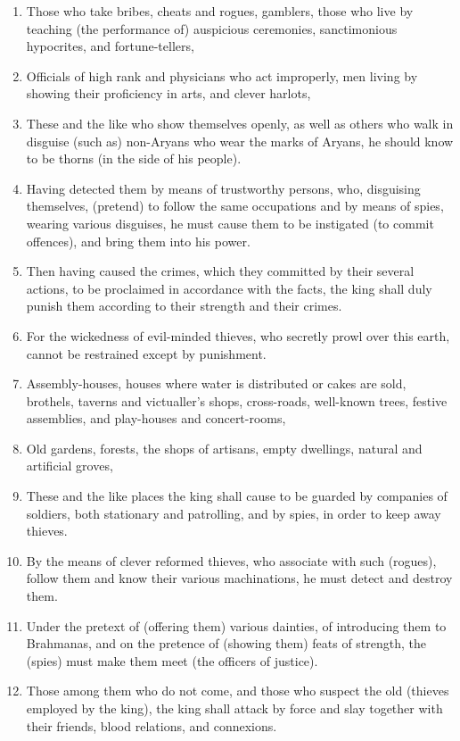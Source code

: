 \begin{enumerate}
\item Those who take bribes, cheats and rogues, gamblers, those who live by teaching (the performance of) auspicious ceremonies, sanctimonious hypocrites, and fortune-tellers,
\item Officials of high rank and physicians who act improperly, men living by showing their proficiency in arts, and clever harlots,
\item These and the like who show themselves openly, as well as others who walk in disguise (such as) non-Aryans who wear the marks of Aryans, he should know to be thorns (in the side of his people).
\item Having detected them by means of trustworthy persons, who, disguising themselves, (pretend) to follow the same occupations and by means of spies, wearing various disguises, he must cause them to be instigated (to commit offences), and bring them into his power.
\item Then having caused the crimes, which they committed by their several actions, to be proclaimed in accordance with the facts, the king shall duly punish them according to their strength and their crimes.
\item For the wickedness of evil-minded thieves, who secretly prowl over this earth, cannot be restrained except by punishment.
\item Assembly-houses, houses where water is distributed or cakes are sold, brothels, taverns and victualler's shops, cross-roads, well-known trees, festive assemblies, and play-houses and concert-rooms,
\item Old gardens, forests, the shops of artisans, empty dwellings, natural and artificial groves,
\item These and the like places the king shall cause to be guarded by companies of soldiers, both stationary and patrolling, and by spies, in order to keep away thieves.
\item By the means of clever reformed thieves, who associate with such (rogues), follow them and know their various machinations, he must detect and destroy them.
\item Under the pretext of (offering them) various dainties, of introducing them to Brahmanas, and on the pretence of (showing them) feats of strength, the (spies) must make them meet (the officers of justice).
\item Those among them who do not come, and those who suspect the old (thieves employed by the king), the king shall attack by force and slay together with their friends, blood relations, and connexions.

\end{enumerate}
